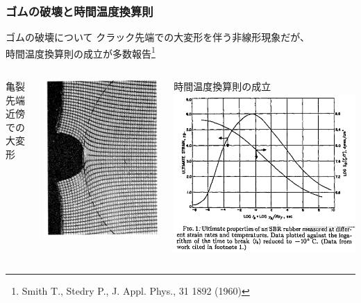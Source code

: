 \documentclass[12pt, dvipdfmx]{beamer}
\begin{document}
\begin{frame}
	\frametitle{ゴムの破壊と時間温度換算則}
		\begin{alertblock}{ゴムの破壊について}
			クラック先端での大変形を伴う非線形現象だが、\\時間温度換算則の成立が多数報告\footnote{
				Smith T., Stedry P., J. Appl. Phys., 31 1892 (1960)
			}
		\end{alertblock}
		\vspace{-2mm}
		\begin{columns}[T, totalwidth=\textwidth]
				亀裂先端近傍での大変形
				\vspace{-3mm}
				\begin{center}
					\includegraphics[width=.55\textwidth]{rubber_crack.png}
				\end{center}
				時間温度換算則の成立
				\includegraphics[width=.8\textwidth]{Time_Temp_2.png}
		\end{columns}
\end{frame}
\end{document}
